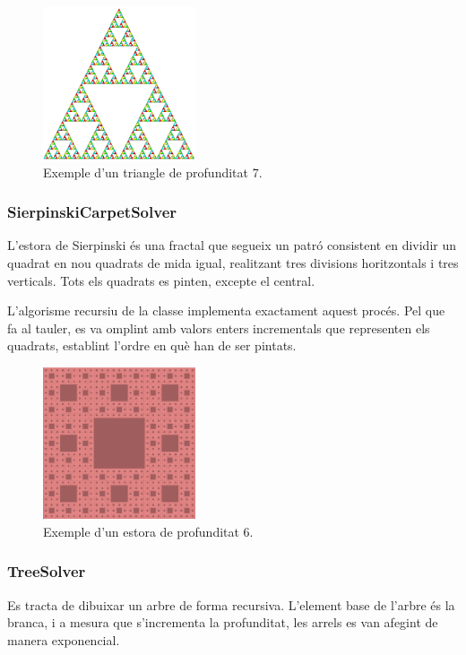 \documentclass{ieeetj}
\begin{document}
\begin{figure}[htbp]
\centerline{\includegraphics[width=0.4\textwidth]{docs/png/FiguraTriangle7.png}}
\caption{Exemple d'un triangle de profunditat 7.}
\label{fig:int2}
\end{figure}


\subsubsection{SierpinskiCarpetSolver}
L'estora de Sierpinski és una fractal que segueix un patró consistent en dividir un quadrat en nou quadrats de mida igual, realitzant tres divisions horitzontals i tres verticals. Tots els quadrats es pinten, excepte el central.

L'algorisme recursiu de la classe implementa exactament aquest procés. Pel que fa al tauler, es va omplint amb valors enters incrementals que representen els quadrats, establint l'ordre en què han de ser pintats.

\begin{figure}[htbp]
\centerline{\includegraphics[width=0.4\textwidth]{docs/png/FiguraEstora6.png}}
\caption{Exemple d'un estora de profunditat 6.}
\label{fig:int2}
\end{figure}

\subsubsection{TreeSolver}
Es tracta de dibuixar un arbre de forma recursiva. L'element base de l'arbre és la branca, i a mesura que s'incrementa la profunditat, les arrels es van afegint de manera exponencial.
\end{document}
